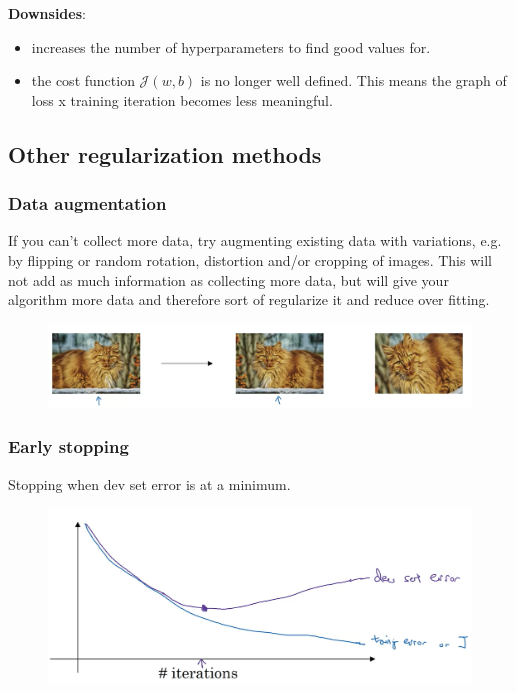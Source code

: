 \textbf{Downsides}:
\begin{itemize}
    \item increases the number of hyperparameters to find good values for.
    \item the cost function $\mathcal{J}(w, b)$ is no longer well defined. 
        This means the graph of loss x training iteration becomes less meaningful.
\end{itemize}

\newpage

\subsection*{Other regularization methods}

\subsubsection*{Data augmentation}

If you can't collect more data, try augmenting existing data with variations, 
e.g. by flipping or random rotation, distortion and/or cropping of images. 
This will not add as much information as collecting more data,
but will give your algorithm more data and therefore sort of regularize it and reduce over fitting.

\begin{figure}[htbp]
    \begin{minipage}[t]{\textwidth}
        \includegraphics[width=\linewidth]{images/augmented_catpic.png}
    \end{minipage}
\end{figure}

\subsubsection*{Early stopping}

Stopping when dev set error is at a minimum.

\begin{figure}[htbp]
    \begin{minipage}[t]{\textwidth}
        \includegraphics[width=\linewidth]{images/early_stopping.png}
    \end{minipage}
\end{figure}

